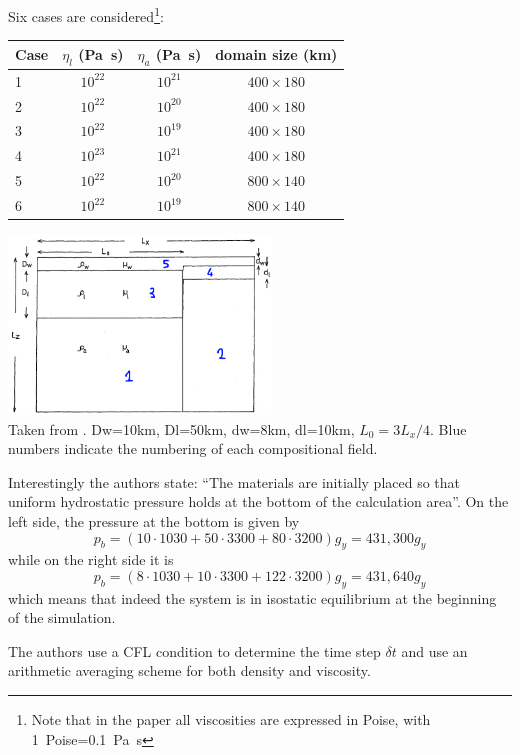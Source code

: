 Six cases are considered\footnote{Note that in the paper all viscosities 
are expressed in Poise, with 1~Poise=0.1~\si{\pascal\second}}:
\begin{center}
\begin{tabular}{lccc}
Case & $\eta_l$ (\si{\pascal\second}) & $\eta_a$  (\si{\pascal\second}) & domain size (\si{\km})\\
\hline
1 & $10^{22}$ & $10^{21}$ & $400\times 180$\\
2 & $10^{22}$ & $10^{20}$ & $400\times 180$\\
3 & $10^{22}$ & $10^{19}$ & $400\times 180$\\
4 & $10^{23}$ & $10^{21}$ & $400\times 180$\\
\hline
5 & $10^{22}$ & $10^{20}$ & $800\times 140$\\
6 & $10^{22}$ & $10^{19}$ & $800\times 140$\\
\hline
\end{tabular}
\end{center}

\begin{center}
\includegraphics[width=7cm]{python_codes/fieldstone_118/images/mato83}\\
{\captionfont Taken from \textcite{mato83}. Dw=10km, Dl=50km, dw=8km, 
dl=10km, $L_0=3L_x/4$. Blue numbers indicate the numbering of each compositional field.}
\end{center}

Interestingly the authors state: ``The materials are initially placed so that 
uniform hydrostatic pressure holds at the bottom of the calculation area''. 
On the left side, the pressure at the bottom is given by 
\[
p_b=(10\cdot 1030+50\cdot 3300+80\cdot3200)g_y = 431,300g_y
\]
while on the right side it is
\[
p_b=(8\cdot 1030+10\cdot 3300+122 \cdot3200)g_y = 431,640g_y
\]
which means that indeed the system is in isostatic equilibrium at the beginning of the 
simulation. 

The authors use a CFL condition to determine the time step $\delta t$ and use an arithmetic 
averaging scheme for both density and viscosity.

